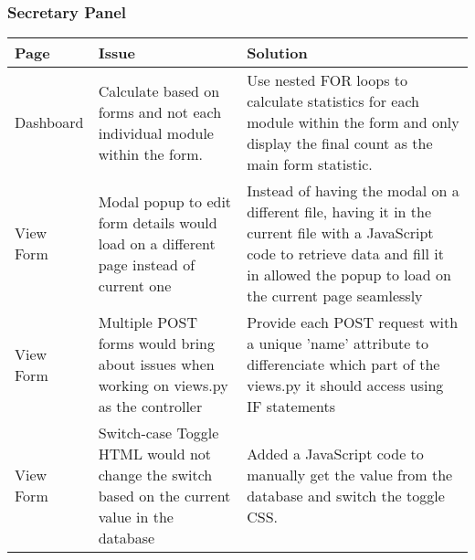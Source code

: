 \documentclass[../main.tex]{subfiles}
\begin{document}
\subsubsection{Secretary Panel}
\begin{table}[H]
\centering
\begin{tabular}{| l | p{6.5cm} | p{6.5cm} |}
\hline
\textbf{Page} & \textbf{Issue}                                                                                 & \textbf{Solution}                                                                                                                                                                              \\ \hline
Dashboard     & Calculate based on forms and not each individual module within the form.                       & Use nested FOR loops to calculate statistics for each module within the form and only display the final count as the main form statistic.                                                      \\ \hline
View Form     & Modal popup to edit form details would load on a different page instead of current one         & Instead of having the modal on a different file, having it in the current file with a JavaScript code to retrieve data and fill it in allowed the popup to load on the current page seamlessly \\ \hline
View Form     & Multiple POST forms would bring about issues when working on views.py as the controller        & Provide each POST request with a unique 'name' attribute to differenciate which part of the views.py it should access using IF statements                                                      \\ \hline
View Form     & Switch-case Toggle HTML would not change the switch based on the current value in the database & Added a JavaScript code to manually get the value from the database and switch the toggle CSS.                                                                                                 \\ \hline
\end{tabular}%

\label{tab:secretarycomplications}
\end{table}
\end{document}
